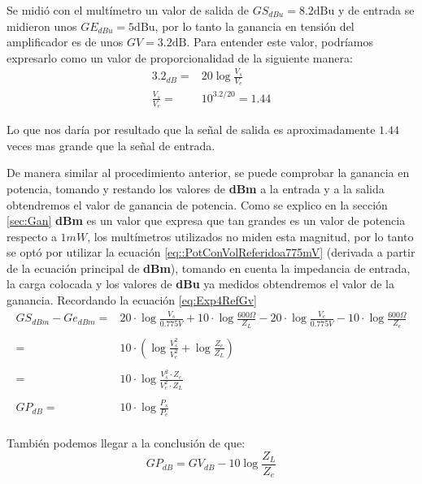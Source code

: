     Se midió con el multímetro un valor de salida de $GS_{dBu} = 8.2 \mathrm{dBu}$ y de entrada se midieron unos $GE_{dBu} = 5 \mathrm{dBu}$, por lo tanto la ganancia en tensión del amplificador es de unos $GV = 3.2 \mathrm{dB}$.
Para entender este valor, podríamos expresarlo como un valor de proporcionalidad de la siguiente manera:
\begin{equation*}
\begin{aligned}
     3.2_{dB}=&20\log{\frac{V_s}{V_e}}\\
     \frac{V_s}{V_e}=&10^{3.2/20} = 1.44
\end{aligned}
\end{equation*}

Lo que nos daría por resultado que la señal de salida es aproximadamente $1.44$ veces mas grande que la señal de entrada.

De manera similar al procedimiento anterior, se puede comprobar la ganancia en potencia, tomando y restando los valores de \textbf{dBm} a la entrada y a la salida obtendremos el valor de ganancia de potencia. Como se explico en la sección \ref{sec:Gan} \textbf{dBm} es un valor que expresa que tan grandes es un valor de potencia respecto a $1mW$, los multímetros utilizados no miden esta magnitud, por lo tanto se optó por utilizar la ecuación \ref{eq::PotConVolReferidoa775mV} (derivada a partir de la ecuación principal de \textbf{dBm}), tomando en cuenta la impedancia de entrada, la carga colocada y los valores de \textbf{dBu} ya medidos obtendremos el valor de la ganancia. Recordando la ecuación \ref{eq:Exp4RefGv}
\begin{equation*}
    \begin{aligned}
        GS_{dBm}-Ge_{dBm}=&20\cdot\log{\frac{V_s}{0.775V}} + 10\cdot\log{\frac{600\Omega}{Z_L}}-20\cdot\log{\frac{V_e}{0.775V}} - 10\cdot\log{\frac{600\Omega}{Z_e}}\\
        \\
        =&10\cdot(\log{\frac{V_s^2}{V_e^2}}+\log{\frac{Z_e}{Z_L}})\\
        \\
        =&10\cdot\log{\frac{V_s^2\cdot Z_e}{V_e^2\cdot Z_L}}\\
        \\
        GP_{dB}=&10\cdot\log{\frac{P_s}{P_e}}\\
    \end{aligned}
\end{equation*}

También podemos llegar a la conclusión de que:
\begin{equation}\label{eq:Exp4PotZ}
    GP_{dB}=GV_{dB}-10\log{\frac{Z_L}{Z_e}}
\end{equation}

